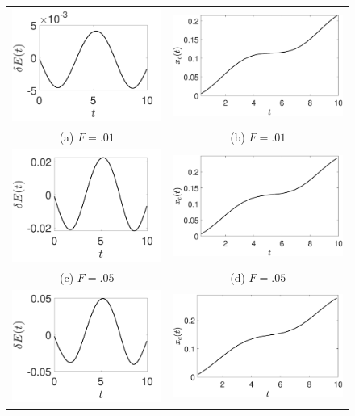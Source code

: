 \documentclass[a4paper,11pt]{article}
\begin{document}
\begin{figure}
\centering
\begin{tabular}{cc}
\includegraphics[width=.35\textwidth]{energy_wm_1_modu_pt3} &  \includegraphics[width=.35\textwidth]{com_wm_1_modu_pt3}\\
(a) $F=.01$ & (b) $F=.01$\\
\includegraphics[width=.35\textwidth]{energy_wm_5_modu_pt3} & \includegraphics[width=.35\textwidth]{com_wm_5_modu_pt3}\\
(c) $F=.05$ & (d) $F=.05$\\
 \includegraphics[width=.35\textwidth]{energy_wm_10_modu_pt3} & \includegraphics[width=.35\textwidth]{com_wm_10_modu_pt3}\\

\end{tabular}
\end{figure}
\end{document}
